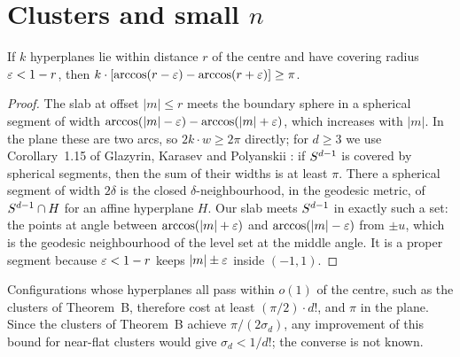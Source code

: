 \documentclass[11pt]{article}
\begin{document}
\section{Clusters and small \texorpdfstring{$n$}{n}}\label{sec:small}

\begin{propThree}
If $k$ hyperplanes lie within distance $r$ of the centre and have covering radius $\varepsilon<1-r$, then
$k\cdot[\arccos(r-\varepsilon)-\arccos(r+\varepsilon)]\ge\pi$.
\end{propThree}

\begin{proof}
The slab at offset $|m|\le r$ meets the boundary sphere in a spherical segment of width
$\arccos(|m|-\varepsilon)-\arccos(|m|+\varepsilon)$, which increases with $|m|$. In the plane these are two arcs, so
$2k\cdot w\ge2\pi$ directly; for $d\ge3$ we use Corollary~1.15 of Glazyrin, Karasev and Polyanskii
\cite{GKP}: if $S^{d-1}$ is covered by spherical segments, then the sum of their widths is at least
$\pi$. There a spherical segment of width $2\delta$ is the closed $\delta$-neighbourhood, in the
geodesic metric, of $S^{d-1}\cap H$ for an affine hyperplane $H$. Our slab meets $S^{d-1}$ in
exactly such a set: the points at angle between $\arccos(|m|+\varepsilon)$ and $\arccos(|m|-\varepsilon)$ from $\pm u$,
which is the geodesic neighbourhood of the level set at the middle angle. It is a proper segment because
$\varepsilon<1-r$ keeps $|m|\pm\varepsilon$ inside $(-1,1)$.
\end{proof}

Configurations whose hyperplanes all pass within $o(1)$ of the centre, such as the clusters of
Theorem~B, therefore cost at least $(\pi/2)\cdot d!$, and $\pi$ in the plane. Since
the clusters of Theorem~B achieve $\pi/(2\sigma_d)$, any improvement of this bound for near-flat
clusters would give $\sigma_d<1/d!$; the converse is not known.
\end{document}

